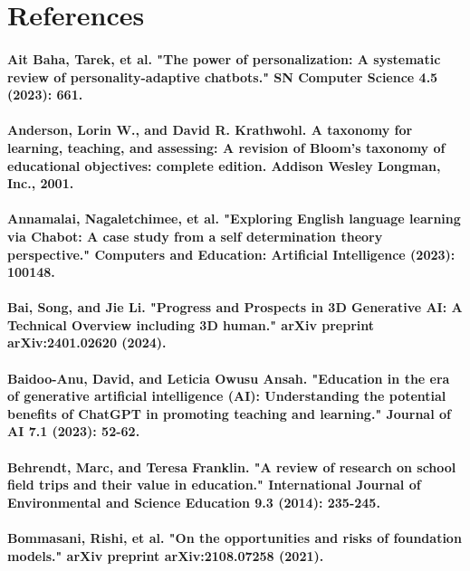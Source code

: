 \documentclass{article}
\begin{document}
\section*{References}

\paragraph{Ait Baha, Tarek, et al. "The power of personalization: A systematic review of personality-adaptive chatbots." SN Computer Science 4.5 (2023): 661.}
\paragraph{Anderson, Lorin W., and David R. Krathwohl. A taxonomy for learning, teaching, and assessing: A revision of Bloom's taxonomy of educational objectives: complete edition. Addison Wesley Longman, Inc., 2001.}
\paragraph{Annamalai, Nagaletchimee, et al. "Exploring English language learning via Chabot: A case study from a self determination theory perspective." Computers and Education: Artificial Intelligence (2023): 100148.}
\paragraph{Bai, Song, and Jie Li. "Progress and Prospects in 3D Generative AI: A Technical Overview including 3D human." arXiv preprint arXiv:2401.02620 (2024).}
\paragraph{Baidoo-Anu, David, and Leticia Owusu Ansah. "Education in the era of generative artificial intelligence (AI): Understanding the potential benefits of ChatGPT in promoting teaching and learning." Journal of AI 7.1 (2023): 52-62.}
\paragraph{Behrendt, Marc, and Teresa Franklin. "A review of research on school field trips and their value in education." International Journal of Environmental and Science Education 9.3 (2014): 235-245. }
\paragraph{Bommasani, Rishi, et al. "On the opportunities and risks of foundation models." arXiv preprint arXiv:2108.07258 (2021).}
\end{document}
